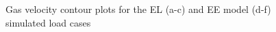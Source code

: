 \documentclass{webofc}
\begin{document}
\begin{figure}[h!]
\hspace{10mm} 
\hspace{10mm} 
\setlength{\belowcaptionskip}{0pt}
\caption{Gas velocity contour plots for the EL (a-c) and EE model (d-f) simulated load cases}
\label{fig_velocity}
\end{figure}
\end{document}
